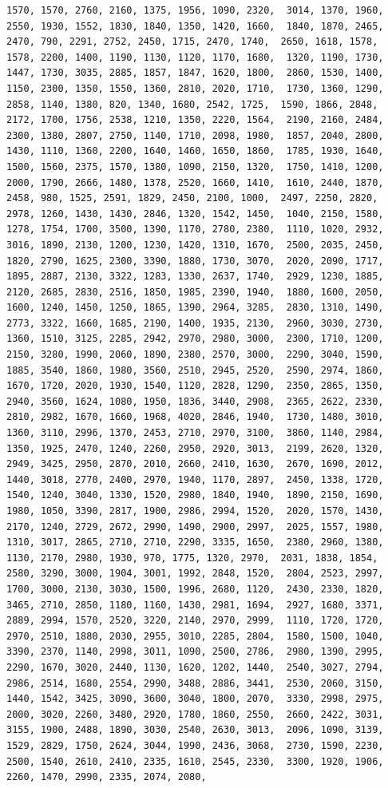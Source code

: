 \documentclass[
]{article}
\begin{document}
\begin{verbatim}
1570, 1570, 2760, 2160, 1375, 1956, 1090, 2320,  3014, 1370, 1960, 2550, 1930, 1552, 1830, 1840, 1350, 1420, 1660,  1840, 1870, 2465, 2470, 790, 2291, 2752, 2450, 1715, 2470, 1740,  2650, 1618, 1578, 1578, 2200, 1400, 1190, 1130, 1120, 1170, 1680,  1320, 1190, 1730, 1447, 1730, 3035, 2885, 1857, 1847, 1620, 1800,  2860, 1530, 1400, 1150, 2300, 1350, 1550, 1360, 2810, 2020, 1710,  1730, 1360, 1290, 2858, 1140, 1380, 820, 1340, 1680, 2542, 1725,  1590, 1866, 2848, 2172, 1700, 1756, 2538, 1210, 1350, 2220, 1564,  2190, 2160, 2484, 2300, 1380, 2807, 2750, 1140, 1710, 2098, 1980,  1857, 2040, 2800, 1430, 1110, 1360, 2200, 1640, 1460, 1650, 1860,  1785, 1930, 1640, 1500, 1560, 2375, 1570, 1380, 1090, 2150, 1320,  1750, 1410, 1200, 2000, 1790, 2666, 1480, 1378, 2520, 1660, 1410,  1610, 2440, 1870, 2458, 980, 1525, 2591, 1829, 2450, 2100, 1000,  2497, 2250, 2820, 2978, 1260, 1430, 1430, 2846, 1320, 1542, 1450,  1040, 2150, 1580, 1278, 1754, 1700, 3500, 1390, 1170, 2780, 2380,  1110, 1020, 2932, 3016, 1890, 2130, 1200, 1230, 1420, 1310, 1670,  2500, 2035, 2450, 1820, 2790, 1625, 2300, 3390, 1880, 1730, 3070,  2020, 2090, 1717, 1895, 2887, 2130, 3322, 1283, 1330, 2637, 1740,  2929, 1230, 1885, 2120, 2685, 2830, 2516, 1850, 1985, 2390, 1940,  1880, 1600, 2050, 1600, 1240, 1450, 1250, 1865, 1390, 2964, 3285,  2830, 1310, 1490, 2773, 3322, 1660, 1685, 2190, 1400, 1935, 2130,  2960, 3030, 2730, 1360, 1510, 3125, 2285, 2942, 2970, 2980, 3000,  2300, 1710, 1200, 2150, 3280, 1990, 2060, 1890, 2380, 2570, 3000,  2290, 3040, 1590, 1885, 3540, 1860, 1980, 3560, 2510, 2945, 2520,  2590, 2974, 1860, 1670, 1720, 2020, 1930, 1540, 1120, 2828, 1290,  2350, 2865, 1350, 2940, 3560, 1624, 1080, 1950, 1836, 3440, 2908,  2365, 2622, 2330, 2810, 2982, 1670, 1660, 1968, 4020, 2846, 1940,  1730, 1480, 3010, 1360, 3110, 2996, 1370, 2453, 2710, 2970, 3100,  3860, 1140, 2984, 1350, 1925, 2470, 1240, 2260, 2950, 2920, 3013,  2199, 2620, 1320, 2949, 3425, 2950, 2870, 2010, 2660, 2410, 1630,  2670, 1690, 2012, 1440, 3018, 2770, 2400, 2970, 1940, 1170, 2897,  2450, 1338, 1720, 1540, 1240, 3040, 1330, 1520, 2980, 1840, 1940,  1890, 2150, 1690, 1980, 1050, 3390, 2817, 1900, 2986, 2994, 1520,  2020, 1570, 1430, 2170, 1240, 2729, 2672, 2990, 1490, 2900, 2997,  2025, 1557, 1980, 1310, 3017, 2865, 2710, 2710, 2290, 3335, 1650,  2380, 2960, 1380, 1130, 2170, 2980, 1930, 970, 1775, 1320, 2970,  2031, 1838, 1854, 2580, 3290, 3000, 1904, 3001, 1992, 2848, 1520,  2804, 2523, 2997, 1700, 3000, 2130, 3030, 1500, 1996, 2680, 1120,  2430, 2330, 1820, 3465, 2710, 2850, 1180, 1160, 1430, 2981, 1694,  2927, 1680, 3371, 2889, 2994, 1570, 2520, 3220, 2140, 2970, 2999,  1110, 1720, 1720, 2970, 2510, 1880, 2030, 2955, 3010, 2285, 2804,  1580, 1500, 1040, 3390, 2370, 1140, 2998, 3011, 1090, 2500, 2786,  2980, 1390, 2995, 2290, 1670, 3020, 2440, 1130, 1620, 1202, 1440,  2540, 3027, 2794, 2986, 2514, 1680, 2554, 2990, 3488, 2886, 3441,  2530, 2060, 3150, 1440, 1542, 3425, 3090, 3600, 3040, 1800, 2070,  3330, 2998, 2975, 2000, 3020, 2260, 3480, 2920, 1780, 1860, 2550,  2660, 2422, 3031, 3155, 1900, 2488, 1890, 3030, 2540, 2630, 3013,  2096, 1090, 3139, 1529, 2829, 1750, 2624, 3044, 1990, 2436, 3068,  2730, 1590, 2230, 2500, 1540, 2610, 2410, 2335, 1610, 2545, 2330,  3300, 1920, 1906, 2260, 1470, 2990, 2335, 2074, 2080, 
\end{verbatim}
\end{document}

